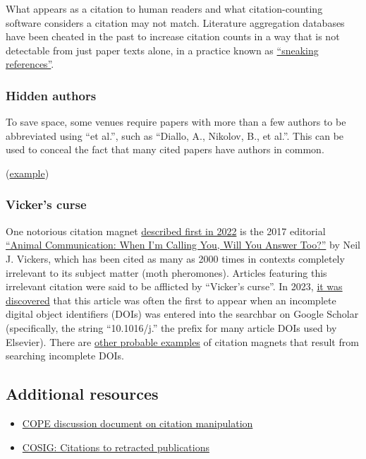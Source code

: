 \documentclass[letterpaper, 12pt]{article}
\begin{document}
What appears as a citation to human readers and what citation-counting software considers a citation may not match.
Literature aggregation databases have been cheated in the past to increase citation counts in a way that is not detectable from just paper texts alone, in a practice known as \href{https://doi.org/10.1002/asi.24896}{``sneaking references''}.

\subsubsection*{Hidden authors}

To save space, some venues require papers with more than a few authors to be abbreviated using ``et al.'',
such as ``Diallo, A., Nikolov, B., et al.''.
This can be used to conceal the fact that many cited papers have authors in common.

(\href{https://pubpeer.com/publications/00DCF18F504B8C420F12A70B5FB30C}{example})

\subsubsection*{Vicker's curse}

One notorious citation magnet \href{https://forbetterscience.com/2022/10/31/when-im-citing-you-will-you-answer-too/}{described first in 2022} is the 2017 editorial \href{https://doi.org/10.1016/j.cub.2017.05.064}{``Animal Communication: When I’m Calling You, Will You Answer Too?''} by Neil J. Vickers, which has been cited as many as 2000 times in contexts completely irrelevant to its subject matter (moth pheromones). Articles featuring this irrelevant citation were said to be afflicted by ``Vicker's curse''. In 2023, \href{https://forbetterscience.com/2023/07/31/the-vickers-curse-secret-revealed/}{it was discovered} that this article was often the first to appear when an incomplete digital object identifiers (DOIs) was entered into the searchbar on Google Scholar (specifically, the string ``10.1016/j.'' the prefix for many article DOIs used by Elsevier). There are \href{https://pubpeer.com/publications/4BB5BE5F56EFEBC3A67D89D1EB5501}{other probable examples} of citation magnets that result from searching incomplete DOIs. 

\subsection*{Additional resources}

\begin{itemize}
    \setlength\itemsep{-0.5em}
    \item \href{https://doi.org/10.24318/cope.2019.3.1}{COPE discussion document on citation manipulation}
    \item \href{https://osf.io/9q3as}{COSIG: Citations to retracted publications}
\end{itemize}
\end{document}
